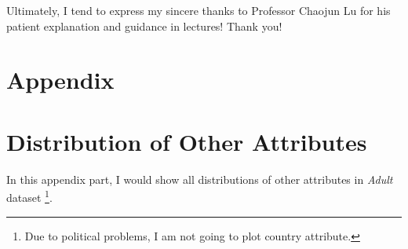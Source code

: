 \documentclass[12pt,a4paper]{article}
\theoremstyle{definition}
\begin{document}
Ultimately, I tend to express my sincere thanks to Professor Chaojun Lu for his patient explanation and guidance in lectures! Thank you!
{\small

\renewcommand{\refname}{References}



\newpage
\section*{Appendix}
\appendix

\section{Distribution of Other Attributes}
In this appendix part, I would show all distributions of other attributes in \textit{Adult} dataset \footnote{Due to political problems, I am not going to plot country attribute.}.
\label{app}

}
\end{document}
